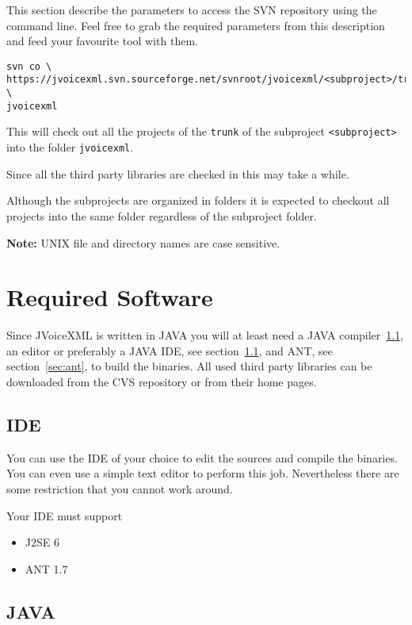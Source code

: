 \documentclass[11pt,a4paper]{article}
\begin{document}
This section describe the parameters to access the SVN repository 
using the command line. Feel free to grab the required parameters from
this description and feed your favourite tool with them.

\begin{lstlisting}
svn co \
https://jvoicexml.svn.sourceforge.net/svnroot/jvoicexml/<subproject>/trunk \
jvoicexml
\end{lstlisting}

This will check out all the projects of the \lstinline{trunk} of
the subproject \lstinline{<subproject>} into the folder \lstinline{jvoicexml}.

Since all the third party libraries are checked in this may
take a while.

Although the subprojects are organized in folders it is expected to
checkout all projects into the same folder regardless of the subproject folder.

\textbf{Note:} UNIX file and directory names are case sensitive.

\section{Required Software}
\label{sec:required-software}

Since JVoiceXML is written in JAVA you will at least need a
JAVA compiler~\ref{sec:ide}, an editor or preferably a JAVA
IDE, see section~\ref{sec:ide}, and ANT, see section~\ref{sec:ant}, to build the
binaries. All used third party libraries can be downloaded from the CVS 
repository or from their home pages.


\subsection{IDE}
\label{sec:ide}

You can use the IDE of your choice to edit the sources and compile the 
binaries. You can even use a simple text editor to perform this job.
Nevertheless there are some restriction that you cannot work around.

Your IDE must support

\begin{itemize}
\item J2SE 6
\item ANT 1.7
\end{itemize}

\subsection{JAVA}
\label{sec:java}
\end{document}
